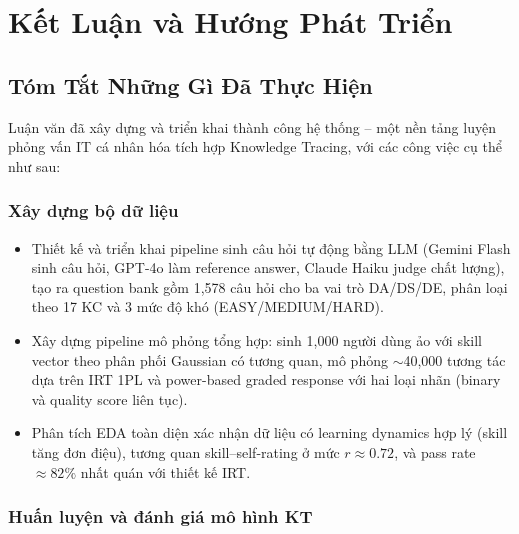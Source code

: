 \chapter{Kết Luận và Hướng Phát Triển}
\label{chap:conclusion}

\section{Tóm Tắt Những Gì Đã Thực Hiện}
\label{sec:summary_done}

Luận văn đã xây dựng và triển khai thành công hệ thống \system{} -- một nền tảng luyện phỏng vấn IT cá nhân hóa tích hợp Knowledge Tracing, với các công việc cụ thể như sau:

\subsection{Xây dựng bộ dữ liệu}

\begin{itemize}
  \item Thiết kế và triển khai pipeline sinh câu hỏi tự động bằng LLM (Gemini Flash sinh câu hỏi, GPT-4o làm reference answer, Claude Haiku judge chất lượng), tạo ra question bank gồm 1{,}578 câu hỏi cho ba vai trò DA/DS/DE, phân loại theo 17 KC và 3 mức độ khó (EASY/MEDIUM/HARD).
  \item Xây dựng pipeline mô phỏng tổng hợp: sinh 1{,}000 người dùng ảo với skill vector theo phân phối Gaussian có tương quan, mô phỏng $\sim$40{,}000 tương tác dựa trên IRT 1PL và power-based graded response với hai loại nhãn (binary và quality score liên tục).
  \item Phân tích EDA toàn diện xác nhận dữ liệu có learning dynamics hợp lý (skill tăng đơn điệu), tương quan skill--self-rating ở mức $r \approx 0.72$, và pass rate $\approx 82\%$ nhất quán với thiết kế IRT.
\end{itemize}

\subsection{Huấn luyện và đánh giá mô hình KT}

